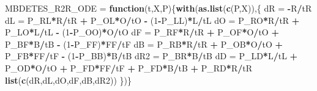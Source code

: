 \documentclass[]{article}
\newenvironment{Shaded}{\begin{snugshade}}{\end{snugshade}}
\newcommand{\ControlFlowTok}[1]{\textcolor[rgb]{0.13,0.29,0.53}{\textbf{#1}}}
\newcommand{\DecValTok}[1]{\textcolor[rgb]{0.00,0.00,0.81}{#1}}
\newcommand{\KeywordTok}[1]{\textcolor[rgb]{0.13,0.29,0.53}{\textbf{#1}}}
\newcommand{\NormalTok}[1]{#1}
\newcommand{\OperatorTok}[1]{\textcolor[rgb]{0.81,0.36,0.00}{\textbf{#1}}}
\newcommand{\StringTok}[1]{\textcolor[rgb]{0.31,0.60,0.02}{#1}}
\begin{document}
\begin{Shaded}
\begin{Highlighting}[]
\NormalTok{MBDETES_R2R_ODE =}\StringTok{ }\ControlFlowTok{function}\NormalTok{(t,X,P)\{}\KeywordTok{with}\NormalTok{(}\KeywordTok{as.list}\NormalTok{(}\KeywordTok{c}\NormalTok{(P,X)),\{}
\NormalTok{  dR =}\StringTok{ }\OperatorTok{-}\NormalTok{R}\OperatorTok{/}\NormalTok{tR}
\NormalTok{  dL =}\StringTok{ }\NormalTok{P_RL}\OperatorTok{*}\NormalTok{R}\OperatorTok{/}\NormalTok{tR }\OperatorTok{+}\StringTok{ }\NormalTok{P_OL}\OperatorTok{*}\NormalTok{O}\OperatorTok{/}\NormalTok{tO }\OperatorTok{-}\StringTok{ }\NormalTok{(}\DecValTok{1}\OperatorTok{-}\NormalTok{P_LL)}\OperatorTok{*}\NormalTok{L}\OperatorTok{/}\NormalTok{tL}
\NormalTok{  dO =}\StringTok{ }\NormalTok{P_RO}\OperatorTok{*}\NormalTok{R}\OperatorTok{/}\NormalTok{tR }\OperatorTok{+}\StringTok{ }\NormalTok{P_LO}\OperatorTok{*}\NormalTok{L}\OperatorTok{/}\NormalTok{tL }\OperatorTok{-}\StringTok{ }\NormalTok{(}\DecValTok{1}\OperatorTok{-}\NormalTok{P_OO)}\OperatorTok{*}\NormalTok{O}\OperatorTok{/}\NormalTok{tO}
\NormalTok{  dF =}\StringTok{ }\NormalTok{P_RF}\OperatorTok{*}\NormalTok{R}\OperatorTok{/}\NormalTok{tR }\OperatorTok{+}\StringTok{ }\NormalTok{P_OF}\OperatorTok{*}\NormalTok{O}\OperatorTok{/}\NormalTok{tO }\OperatorTok{+}\StringTok{ }\NormalTok{P_BF}\OperatorTok{*}\NormalTok{B}\OperatorTok{/}\NormalTok{tB }\OperatorTok{-}\StringTok{ }\NormalTok{(}\DecValTok{1}\OperatorTok{-}\NormalTok{P_FF)}\OperatorTok{*}\NormalTok{FF}\OperatorTok{/}\NormalTok{tF}
\NormalTok{  dB =}\StringTok{ }\NormalTok{P_RB}\OperatorTok{*}\NormalTok{R}\OperatorTok{/}\NormalTok{tR }\OperatorTok{+}\StringTok{ }\NormalTok{P_OB}\OperatorTok{*}\NormalTok{O}\OperatorTok{/}\NormalTok{tO }\OperatorTok{+}\StringTok{ }\NormalTok{P_FB}\OperatorTok{*}\NormalTok{FF}\OperatorTok{/}\NormalTok{tF }\OperatorTok{-}\StringTok{ }\NormalTok{(}\DecValTok{1}\OperatorTok{-}\NormalTok{P_BB)}\OperatorTok{*}\NormalTok{B}\OperatorTok{/}\NormalTok{tB}
\NormalTok{  dR2 =}\StringTok{ }\NormalTok{P_BR}\OperatorTok{*}\NormalTok{B}\OperatorTok{/}\NormalTok{tB}
\NormalTok{  dD  =}\StringTok{ }\NormalTok{P_LD}\OperatorTok{*}\NormalTok{L}\OperatorTok{/}\NormalTok{tL }\OperatorTok{+}\StringTok{ }\NormalTok{P_OD}\OperatorTok{*}\NormalTok{O}\OperatorTok{/}\NormalTok{tO }\OperatorTok{+}\StringTok{ }\NormalTok{P_FD}\OperatorTok{*}\NormalTok{FF}\OperatorTok{/}\NormalTok{tF }\OperatorTok{+}\StringTok{ }\NormalTok{P_FD}\OperatorTok{*}\NormalTok{B}\OperatorTok{/}\NormalTok{tB }\OperatorTok{+}\StringTok{ }\NormalTok{P_RD}\OperatorTok{*}\NormalTok{R}\OperatorTok{/}\NormalTok{tR}
  \KeywordTok{list}\NormalTok{(}\KeywordTok{c}\NormalTok{(dR,dL,dO,dF,dB,dR2))}
\NormalTok{\})\}}


\end{Highlighting}
\end{Shaded}
\end{document}
